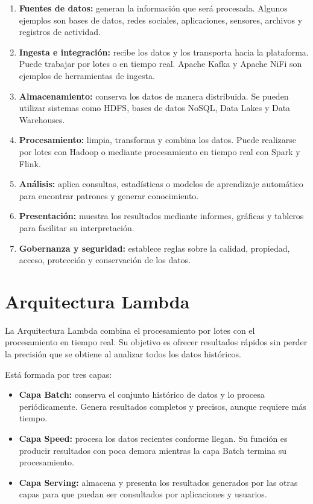 \begin{enumerate}
    \item \textbf{Fuentes de datos:} generan la información que será
    procesada. Algunos ejemplos son bases de datos, redes sociales,
    aplicaciones, sensores, archivos y registros de actividad.

    \item \textbf{Ingesta e integración:} recibe los datos y los transporta
    hacia la plataforma. Puede trabajar por lotes o en tiempo real.
    Apache Kafka y Apache NiFi son ejemplos de herramientas de ingesta.

    \item \textbf{Almacenamiento:} conserva los datos de manera distribuida.
    Se pueden utilizar sistemas como HDFS, bases de datos NoSQL, Data Lakes
    y Data Warehouses.

    \item \textbf{Procesamiento:} limpia, transforma y combina los datos.
    Puede realizarse por lotes con Hadoop o mediante procesamiento en tiempo
    real con Spark y Flink.

    \item \textbf{Análisis:} aplica consultas, estadísticas o modelos de
    aprendizaje automático para encontrar patrones y generar conocimiento.

    \item \textbf{Presentación:} muestra los resultados mediante informes,
    gráficas y tableros para facilitar su interpretación.

    \item \textbf{Gobernanza y seguridad:} establece reglas sobre la calidad,
    propiedad, acceso, protección y conservación de los datos.
\end{enumerate}

\section{Arquitectura Lambda}

La Arquitectura Lambda combina el procesamiento por lotes con el
procesamiento en tiempo real. Su objetivo es ofrecer resultados rápidos sin
perder la precisión que se obtiene al analizar todos los datos históricos.

Está formada por tres capas:

\begin{itemize}
    \item \textbf{Capa Batch:} conserva el conjunto histórico de datos y lo
    procesa periódicamente. Genera resultados completos y precisos, aunque
    requiere más tiempo.

    \item \textbf{Capa Speed:} procesa los datos recientes conforme llegan.
    Su función es producir resultados con poca demora mientras la capa Batch
    termina su procesamiento.

    \item \textbf{Capa Serving:} almacena y presenta los resultados generados
    por las otras capas para que puedan ser consultados por aplicaciones y
    usuarios.
\end{itemize}


